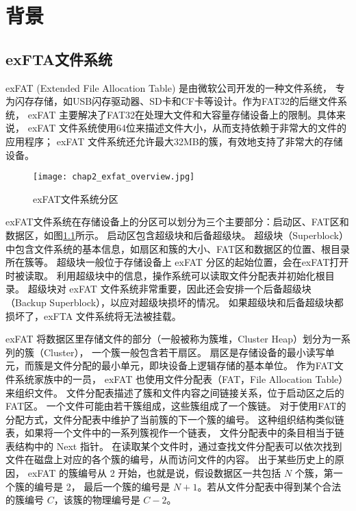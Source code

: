 
\chapter{背景}
\section{exFTA文件系统}
exFAT (Extended File Allocation Table)\parencite{exFAT} 是由微软公司开发的一种文件系统，
专为闪存存储，如USB闪存驱动器、SD卡和CF卡等设计。作为FAT32的后继文件系统，
exFAT 主要解决了FAT32在处理大文件和大容量存储设备上的限制。具体来说，
exFAT 文件系统使用64位来描述文件大小，从而支持依赖于非常大的文件的应用程序；
exFAT 文件系统还允许最大32MB的簇，有效地支持了非常大的存储设备。

\begin{figure}[h]
    \centering
    \texttt{[image: chap2\_exfat\_overview.jpg]}
    \caption{exFAT文件系统分区}
    \label{fig:exfat_overview}
\end{figure}

exFAT文件系统在存储设备上的分区可以划分为三个主要部分：启动区、FAT区和数据区，如图\ref{fig:exfat_overview}所示。
启动区包含超级块和后备超级块。
超级块（Superblock）中包含文件系统的基本信息，如扇区和簇的大小、FAT区和数据区的位置、根目录所在簇等。
超级块一般位于存储设备上 exFAT 分区的起始位置，会在exFAT打开时被读取。
利用超级块中的信息，操作系统可以读取文件分配表并初始化根目录。
超级块对 exFAT 文件系统非常重要，因此还会安排一个后备超级块（Backup Superblock），以应对超级块损坏的情况。
如果超级块和后备超级块都损坏了，exFTA 文件系统将无法被挂载。

exFAT 将数据区里存储文件的部分（一般被称为簇堆，Cluster Heap）划分为一系列的簇（Cluster），
一个簇一般包含若干扇区。
扇区是存储设备的最小读写单元，而簇是文件分配的最小单元，即块设备上逻辑存储的基本单位。
作为FAT文件系统家族中的一员， exFAT 也使用文件分配表（FAT，File Allocation Table）来组织文件。
文件分配表描述了簇和文件内容之间链接关系，位于启动区之后的FAT区。
一个文件可能由若干簇组成，这些簇组成了一个簇链。
对于使用FAT的分配方式，文件分配表中维护了当前簇的下一个簇的编号。
这种组织结构类似链表，如果将一个文件中的一系列簇视作一个链表，
文件分配表中的条目相当于链表结构中的 Next 指针。
在读取某个文件时，通过查找文件分配表可以依次找到文件在磁盘上对应的各个簇的编号，从而访问文件的内容。
出于某些历史上的原因， exFAT 的簇编号从 2 开始，也就是说，假设数据区一共包括 $ N $ 个簇，第一个簇的编号是 2，
最后一个簇的编号是 $ N + 1 $。若从文件分配表中得到某个合法的簇编号 $ C $，该簇的物理编号是 $ C - 2 $。

